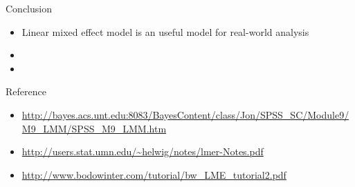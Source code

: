 \documentclass[ignorenonframetext,]{beamer}
\begin{document}
\begin{frame}{Conclusion}

\begin{itemize}
\item
  Linear mixed effect model is an useful model for real-world analysis
\item
\item
\end{itemize}

\end{frame}

\begin{frame}{Reference}

\begin{itemize}
\item
  \url{http://bayes.acs.unt.edu:8083/BayesContent/class/Jon/SPSS_SC/Module9/M9_LMM/SPSS_M9_LMM.htm}
\item
  \url{http://users.stat.umn.edu/~helwig/notes/lmer-Notes.pdf}
\item
  \url{http://www.bodowinter.com/tutorial/bw_LME_tutorial2.pdf}
\end{itemize}

\end{frame}
\end{document}
